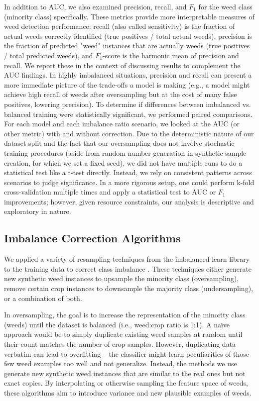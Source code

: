 \documentclass[agriengineering,article,submit,pdftex,moreauthors]{Definitions/mdpi}
\begin{document}
%
In addition to AUC, we also examined precision, recall, and $F_{1}$ for the weed class (minority class) specifically. These metrics provide more interpretable measures of weed detection performance: recall (also called sensitivity) is the fraction of actual weeds correctly identified (true positives / total actual weeds), precision is the fraction of predicted "weed" instances that are actually weeds (true positives / total predicted weeds), and $F_{1}$-score is the harmonic mean of precision and recall. We report these in the context of discussing results to complement the AUC findings. In highly imbalanced situations, precision and recall can present a more immediate picture of the trade-offs a model is making (e.g., a model might achieve high recall of weeds after oversampling but at the cost of many false positives, lowering precision). To determine if differences between imbalanced vs. balanced training were statistically significant, we performed paired comparisons. For each model and each imbalance ratio scenario, we looked at the AUC (or other metric) with and without correction. Due to the deterministic nature of our dataset split and the fact that our oversampling does not involve stochastic training procedures (aside from random number generation in synthetic sample creation, for which we set a fixed seed), we did not have multiple runs to do a statistical test like a t-test directly. Instead, we rely on consistent patterns across scenarios to judge significance. In a more rigorous setup, one could perform k-fold cross-validation multiple times and apply a statistical test to AUC or $F_{1}$ improvements; however, given resource constraints, our analysis is descriptive and exploratory in nature. 
%
\subsection{Imbalance Correction Algorithms}
We applied a variety of resampling techniques from the imbalanced-learn library  to the training data to correct class imbalance \cite{Lemaitre2016-iz}. These techniques either generate new synthetic weed instances to upsample the minority class (oversampling), remove certain crop instances to downsample the majority class (undersampling), or a combination of both.

In oversampling, the goal is to increase the representation of the minority class (weeds) until the dataset is balanced (i.e., weed:crop ratio is 1:1). A naïve approach would be to simply duplicate existing weed samples at random until their count matches the number of crop samples. However, duplicating data verbatim can lead to overfitting – the classifier might learn peculiarities of those few weed examples too well and not generalize. Instead, the methods we use generate new synthetic weed instances that are similar to the real ones but not exact copies. By interpolating or otherwise sampling the feature space of weeds, these algorithms aim to introduce variance and new plausible examples of weeds. 
\end{document}
